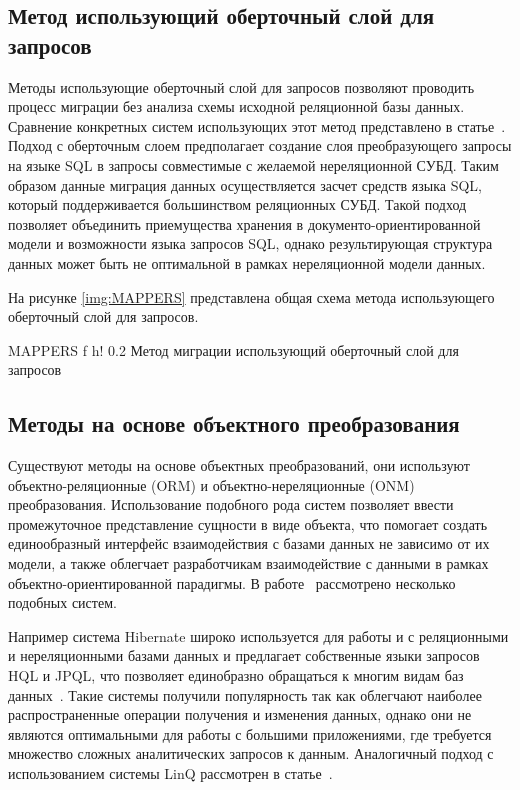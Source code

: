 \clearpage

\subsection{Метод использующий оберточный слой для запросов}
Методы использующие оберточный слой для запросов позволяют проводить процесс миграции без анализа схемы исходной реляционной базы данных.
Сравнение конкретных систем использующих этот метод представлено в статье~\cite{mappers}.
Подход с оберточным слоем предполагает создание слоя преобразующего запросы на языке SQL в запросы совместимые с желаемой нереляционной СУБД.
Таким образом данные миграция данных осуществляется засчет средств языка SQL, который поддерживается большинством реляционных СУБД.
Такой подход позволяет объединить приемущества хранения в документо-ориентированной модели и возможности языка запросов SQL,
однако результирующая структура данных может быть не оптимальной в рамках нереляционной модели данных.

На рисунке \ref{img:MAPPERS} представлена общая схема метода использующего оберточный слой для запросов.

  {MAPPERS} %
  {f} %
  {h!} %
  {0.2\textwidth} %
{Метод миграции использующий оберточный слой для запросов} %

\clearpage

\subsection{Методы на основе объектного преобразования}
Существуют методы на основе объектных преобразований, они используют объектно-реляционные (ORM) и объектно-нереляционные (ONM) преобразования.
Использование подобного рода систем позволяет ввести промежуточное представление сущности в виде объекта,
что помогает создать единообразный интерфейс взаимодействия с базами данных не зависимо от их модели,
а также облегчает разработчикам взаимодействие с данными в рамках объектно-ориентированной парадигмы.
В работе~\cite{ONM} рассмотрено несколько подобных систем.

Например система Hibernate широко используется для работы и с реляционными и нереляционными базами данных и предлагает собственные языки запросов HQL и JPQL,
что позволяет единобразно обращаться к многим видам баз данных~\cite{hibernateogm}.
Такие системы получили популярность так как облегчают наиболее распространенные операции получения и изменения данных,
однако они не являются оптимальными для работы с большими приложениями,
где требуется множество сложных аналитических запросов к данным.
Аналогичный подход с использованием системы LinQ рассмотрен в статье~\cite{linq}.

